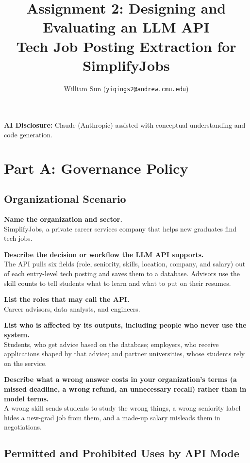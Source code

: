 \documentclass[11pt]{article}
\title{\textbf{Assignment 2: Designing and Evaluating an LLM API} \\ \medskip \large Tech Job Posting Extraction for SimplifyJobs}
\author{William Sun (\texttt{yiqings2@andrew.cmu.edu})}
\date{}
\newcommand{\q}[1]{\par\noindent\textbf{#1}\\}
\begin{document}
\maketitle

\noindent\textbf{AI Disclosure:} Claude (Anthropic) assisted with conceptual understanding and code generation.

\section{Part A: Governance Policy}

\subsection{Organizational Scenario}

\q{Name the organization and sector.}
SimplifyJobs, a private career services company that helps new graduates find tech jobs.

\q{Describe the decision or workflow the LLM API supports.}
The API pulls six fields (role, seniority, skills, location, company, and salary) out of each entry-level tech posting and saves them to a database. Advisors use the skill counts to tell students what to learn and what to put on their resumes.

\q{List the roles that may call the API.}
Career advisors, data analysts, and engineers.

\q{List who is affected by its outputs, including people who never use the system.}
Students, who get advice based on the database; employers, who receive applications shaped by that advice; and partner universities, whose students rely on the service.

\q{Describe what a wrong answer costs in your organization's terms (a missed deadline, a wrong refund, an unnecessary recall) rather than in model terms.}
A wrong skill sends students to study the wrong things, a wrong seniority label hides a new-grad job from them, and a made-up salary misleads them in negotiations.

\subsection{Permitted and Prohibited Uses by API Mode}
\end{document}
